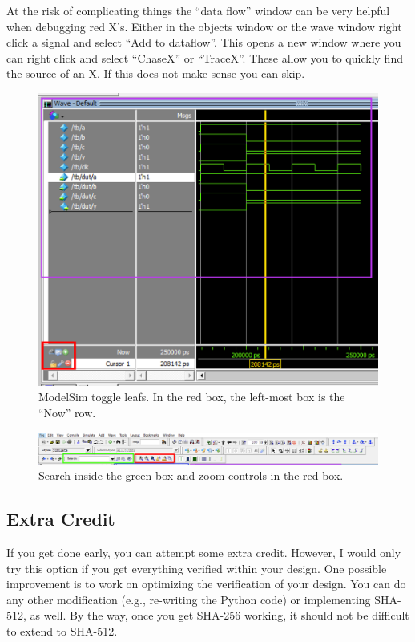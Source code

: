 \documentclass{article}
\begin{document}
At the risk of complicating things the ``data flow'' window can be very
helpful when debugging red X's.  Either in the objects window or the wave
window right click a signal and select ``Add to dataflow''. This opens
a new window where you can right click and select ``ChaseX'' or ``TraceX''.
These allow you to quickly find the source of an X.  If this does not make
sense you can skip.
\begin{figure} [t!]
  \centering
  \includegraphics[scale=0.4]{modelsim-tips1.png}
  \caption{ModelSim toggle leafs. In the red box, the left-most box is the ``Now'' row.}
  \label{modelsim-tips1.png}
\end{figure}
\begin{figure} [t!]
  \centering
  \includegraphics[scale=0.32]{modelsim-tips2.png}
  \caption{Search inside the green box and zoom controls in the red box.}
  \label{modelsim-tips2.png}
\end{figure}

\subsection{Extra Credit}

If you get done early, you can attempt some extra credit.  However, I
would only try this option if you get everything verified within your
design.  
One possible improvement is to work on optimizing the verification
of your design.  You can do any other modification (e.g., re-writing
the Python code) or implementing SHA-512, as well.  By the way, once
you get SHA-256 working, it should not be difficult to extend to
SHA-512.
\end{document}
